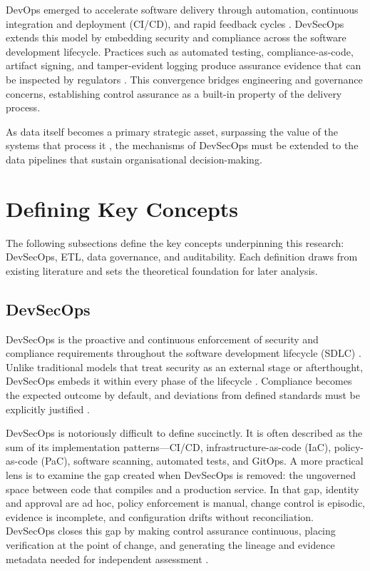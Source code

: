 DevOps emerged to accelerate software delivery through automation, continuous
integration and deployment (CI/CD), and rapid feedback cycles
\cite{elbaghazaoui_integrating_2025-1}. DevSecOps extends this model by embedding
security and compliance across the software development lifecycle. Practices
such as automated testing, compliance-as-code, artifact signing, and
tamper-evident logging produce assurance evidence that can be inspected by
regulators \cite{anisetti_devsecops-based_2022, castellanos_accordant_2021,
elbaghazaoui_integrating_2025-1}. This convergence bridges engineering and
governance concerns, establishing control assurance as a built-in property of
the delivery process.

As data itself becomes a primary strategic asset, surpassing the value of the
systems that process it \cite{elbaghazaoui_data_2025,
elbaghazaoui_ensuring_2025}, the mechanisms of DevSecOps must be extended to the
data pipelines that sustain organisational decision-making.

\section{Defining Key Concepts}
\noindent
The following subsections define the key concepts underpinning this research:
DevSecOps, ETL, data governance, and auditability. Each definition draws from
existing literature and sets the theoretical foundation for later analysis.

\subsection*{DevSecOps}

\noindent
DevSecOps is the proactive and continuous enforcement of security and compliance
requirements throughout the software development lifecycle (SDLC)
\cite{anisetti_devsecops-based_2022}. Unlike traditional models that treat
security as an external stage or afterthought, DevSecOps embeds it within every
phase of the lifecycle \cite{anisetti_semi-automatic_2020}. Compliance becomes
the expected outcome by default, and deviations from defined standards must be
explicitly justified \cite{castellanos_accordant_2021}.

DevSecOps is notoriously difficult to define succinctly. It is often described
as the sum of its implementation patterns—CI/CD, infrastructure-as-code (IaC),
policy-as-code (PaC), software scanning, automated tests, and GitOps. A more
practical lens is to examine the gap created when DevSecOps is removed: the
ungoverned space between code that compiles and a production service. In that
gap, identity and approval are ad hoc, policy enforcement is manual, change
control is episodic, evidence is incomplete, and configuration drifts without
reconciliation. DevSecOps closes this gap by making control assurance
continuous, placing verification at the point of change, and generating the
lineage and evidence metadata needed for independent assessment
\cite{souppaya_secure_2022, anisetti_devsecops-based_2022}.

